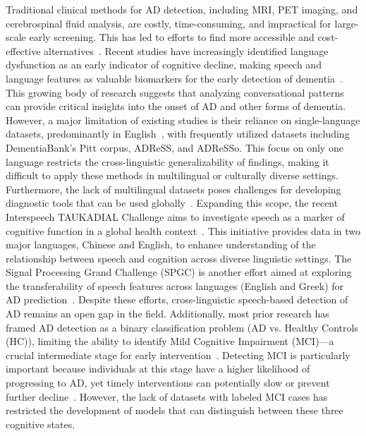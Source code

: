 Traditional clinical methods for AD detection, including MRI, PET imaging, and cerebrospinal fluid analysis, are costly, time-consuming, and impractical for large-scale early screening. This has led to efforts to find more accessible and cost-effective alternatives~\cite{yang2022deep}. Recent studies have increasingly identified language dysfunction as an early indicator of cognitive decline, making speech and language features as valuable biomarkers for the early detection of dementia~\cite{petti2020systematic, Language2024}. This growing body of research suggests that analyzing conversational patterns can provide critical insights into the onset of AD and other forms of dementia. However, a major limitation of existing studies is their reliance on single-language datasets, predominantly in English~\cite{perez2022alzheimer, NCMMSC2021, Agbavor2022plos}, with frequently utilized datasets including DementiaBank’s Pitt corpus, ADReSS, and ADReSSo.  This focus on only one language restricts the cross-linguistic generalizability of findings, making it difficult to apply these methods in multilingual or culturally diverse settings. Furthermore, the lack of multilingual datasets poses challenges for developing diagnostic tools that can be used globally~\cite{fraseretal2019multilingual}.
Expanding this scope, the recent Interspeech TAUKADIAL Challenge aims to investigate speech as a marker of cognitive function in a global health context~\cite{Benjamin2024}. This initiative provides data in two major languages, Chinese and English, to enhance understanding of the relationship between speech and cognition across diverse linguistic settings.
The Signal Processing Grand Challenge (SPGC) is another effort aimed at exploring the transferability of speech features across languages (English and Greek) for AD prediction~\cite{luz2023multilingual}. %
Despite these efforts, cross-linguistic speech-based detection of AD remains an open gap in the field. Additionally, most prior research has framed AD detection as a binary classification problem (AD vs. Healthy Controls (HC)), limiting the ability to identify Mild Cognitive Impairment (MCI)---a crucial intermediate stage for early intervention~\cite{shakeri2025natural}. Detecting MCI is particularly important because individuals at this stage have a higher likelihood of progressing to AD, yet timely interventions can potentially slow or prevent further decline~\cite{Knopman2014mayo}. However, the lack of datasets with labeled MCI cases has restricted the development of models that can distinguish between these three cognitive states.

